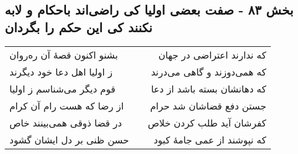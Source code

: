 \begin{center}
\section*{بخش ۸۳ - صفت بعضی اولیا کی راضی‌اند باحکام و لابه نکنند کی این حکم را بگردان}
\label{sec:sh083}
\begin{longtable}{l p{0.5cm} r}
بشنو اکنون قصهٔ آن ره‌روان
&&
که ندارند اعتراضی در جهان
\\
ز اولیا اهل دعا خود دیگرند
&&
که همی‌دوزند و گاهی می‌درند
\\
قوم دیگر می‌شناسم ز اولیا
&&
که دهانشان بسته باشد از دعا
\\
از رضا که هست رام آن کرام
&&
جستن دفع قضاشان شد حرام
\\
در قضا ذوقی همی‌بینند خاص
&&
کفرشان آید طلب کردن خلاص
\\
حسن ظنی بر دل ایشان گشود
&&
که نپوشند از عمی جامهٔ کبود
\\
\end{longtable}
\end{center}
